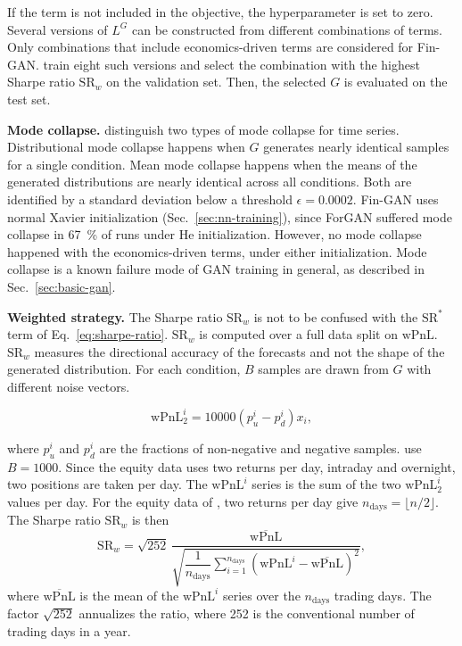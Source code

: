 If the term is not included in the objective, the hyperparameter is set to zero. Several versions of $L^{G}$ can be constructed from different combinations of terms. Only combinations that include economics-driven terms are considered for Fin-GAN. \textcite{vuleticFinGANForecastingClassifying2024} train eight such versions and select the combination with the highest Sharpe ratio $\mathrm{SR}_{w}$ on the validation set. Then, the selected $G$ is evaluated on the test set.

\textbf{Mode collapse.} \textcite{vuleticFinGANForecastingClassifying2024} distinguish two types of mode collapse for time series. Distributional mode collapse happens 
when $G$ generates nearly identical samples for a single condition. 
Mean mode collapse happens when the means of the generated
distributions are nearly identical across all conditions.
Both are identified by a standard deviation below a threshold $\epsilon=0.0002$. Fin-GAN uses normal Xavier initialization (Sec.~\ref{sec:nn-training}), since ForGAN suffered mode collapse in \SI{67}{\percent} of runs under He initialization. However, no mode collapse happened with the economics-driven terms, under either initialization. Mode collapse is a known failure mode of GAN training in general, as described in Sec.~\ref{sec:basic-gan}. 

\textbf{Weighted strategy.} The Sharpe ratio $\mathrm{SR}_{w}$ is not to be confused with the
$\mathrm{SR}^{*}$ term of Eq.~\ref{eq:sharpe-ratio}. $\mathrm{SR}_{w}$
is computed over a full data split on $\mathrm{wPnL}$. $\mathrm{SR}_{w}$ measures the directional accuracy of the forecasts and not the shape of the generated distribution. For each condition, $B$ samples are drawn from $G$ with different noise vectors. 

\begin{equation}
    \label{eq:wpnl-trade}
    \mathrm{wPnL}^{i}_{2} = 10000 \left( p^{i}_{u} - p^{i}_{d} \right) x_i ,
\end{equation}

where $p^{i}_{u}$ and $p^{i}_{d}$ are the fractions of non-negative and negative samples. \textcite{vuleticFinGANForecastingClassifying2024} use $B = 1000$. Since the equity data uses two returns per day, intraday and overnight, two positions are taken per day. The $\mathrm{wPnL}^{i}$ series is 
the sum of the two $\mathrm{wPnL}^{i}_{2}$ values per day. 
For the equity data of \textcite{vuleticFinGANForecastingClassifying2024}, two returns per day give $n_{\text{days}} = \lfloor n/2 \rfloor$. The Sharpe ratio $\mathrm{SR}_{w}$ is then
\begin{equation}
    \label{eq:sharpe-weighted}
    \mathrm{SR}_{w} = \sqrt{252} \,
    \frac{\overline{\mathrm{wPnL}}}
         {\sqrt{\dfrac{1}{n_{\text{days}}}
          \sum_{i=1}^{n_{\text{days}}}
          \left( \mathrm{wPnL}^{i} - \overline{\mathrm{wPnL}} \right)^{2}}},
\end{equation}
where $\overline{\mathrm{wPnL}}$ is the mean of the $\mathrm{wPnL}^{i}$ series over the $n_{\text{days}}$ trading days. The factor $\sqrt{252}$ annualizes the ratio, where 252 is the conventional number of trading days in a year.